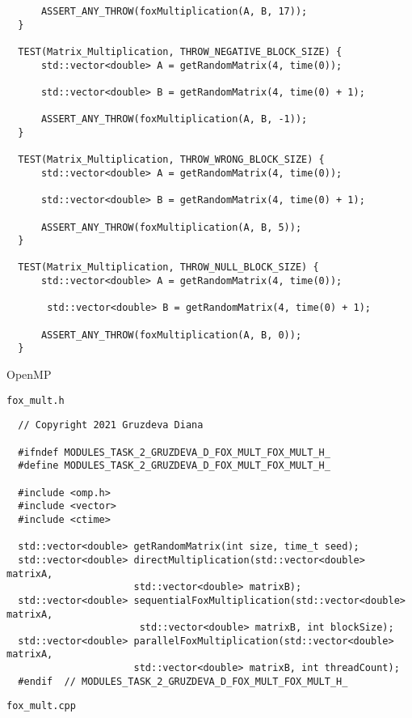 \documentclass{article}
\begin{document}
\begin{lstlisting}
      ASSERT_ANY_THROW(foxMultiplication(A, B, 17));
  }

  TEST(Matrix_Multiplication, THROW_NEGATIVE_BLOCK_SIZE) {
      std::vector<double> A = getRandomMatrix(4, time(0));

      std::vector<double> B = getRandomMatrix(4, time(0) + 1);

      ASSERT_ANY_THROW(foxMultiplication(A, B, -1));
  }

  TEST(Matrix_Multiplication, THROW_WRONG_BLOCK_SIZE) {
      std::vector<double> A = getRandomMatrix(4, time(0));

      std::vector<double> B = getRandomMatrix(4, time(0) + 1);

      ASSERT_ANY_THROW(foxMultiplication(A, B, 5));
  }

  TEST(Matrix_Multiplication, THROW_NULL_BLOCK_SIZE) {
      std::vector<double> A = getRandomMatrix(4, time(0));

       std::vector<double> B = getRandomMatrix(4, time(0) + 1);

      ASSERT_ANY_THROW(foxMultiplication(A, B, 0));
  }
\end{lstlisting}
\par
OpenMP
\par
\lstinline$fox_mult.h$
\begin{lstlisting}
  // Copyright 2021 Gruzdeva Diana

  #ifndef MODULES_TASK_2_GRUZDEVA_D_FOX_MULT_FOX_MULT_H_
  #define MODULES_TASK_2_GRUZDEVA_D_FOX_MULT_FOX_MULT_H_

  #include <omp.h>
  #include <vector>
  #include <ctime>

  std::vector<double> getRandomMatrix(int size, time_t seed);
  std::vector<double> directMultiplication(std::vector<double> matrixA,
                      std::vector<double> matrixB);
  std::vector<double> sequentialFoxMultiplication(std::vector<double> matrixA,
                       std::vector<double> matrixB, int blockSize);
  std::vector<double> parallelFoxMultiplication(std::vector<double> matrixA,
                      std::vector<double> matrixB, int threadCount);
  #endif  // MODULES_TASK_2_GRUZDEVA_D_FOX_MULT_FOX_MULT_H_
\end{lstlisting}
\par
\lstinline$fox_mult.cpp$
\end{document}
